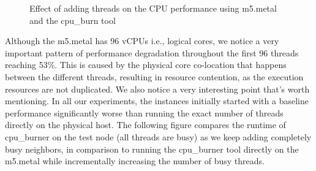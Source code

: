 \begin{figure}[H]
\centering
{}
\caption{Effect of adding threads on the CPU performance using m5.metal and the cpu\_burn tool} 
\end{figure}
\noindent
Although the m5.metal has 96 vCPUs i.e., logical cores, we 
notice a very important pattern of performance degradation throughout the first 96 threads reaching 53\%. 
This is caused by the physical core co-location that happens between the different 
threads, resulting in resource contention, as the execution resources are not duplicated. 
We also notice a very interesting point that's worth mentioning. In all our experiments, the instances 
initially started with a baseline performance significantly worse than running the exact number of threads 
directly on the physical host. The following figure compares the runtime of cpu\_burner on the test node 
(all threads are busy) as we keep adding completely busy neighbors, in comparison to running the cpu\_burner 
tool directly on the m5.metal while incrementally increasing the number of busy threads. 
